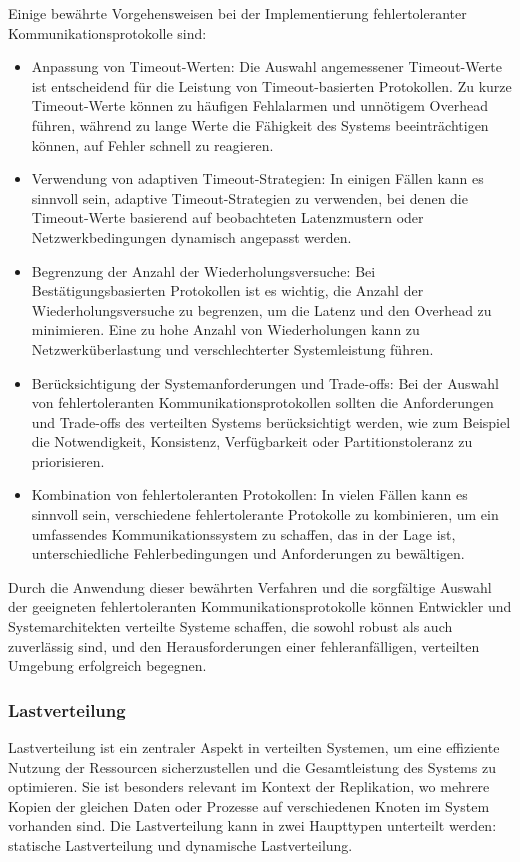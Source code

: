 Einige bewährte Vorgehensweisen bei der Implementierung fehlertoleranter Kommunikationsprotokolle sind:
\begin{itemize}
\item Anpassung von Timeout-Werten: Die Auswahl angemessener Timeout-Werte ist entscheidend für die Leistung von Timeout-basierten Protokollen. Zu kurze Timeout-Werte können zu häufigen Fehlalarmen und unnötigem Overhead führen, während zu lange Werte die Fähigkeit des Systems beeinträchtigen können, auf Fehler schnell zu reagieren.
\item Verwendung von adaptiven Timeout-Strategien: In einigen Fällen kann es sinnvoll sein, adaptive Timeout-Strategien zu verwenden, bei denen die Timeout-Werte basierend auf beobachteten Latenzmustern oder Netzwerkbedingungen dynamisch angepasst werden.
\item Begrenzung der Anzahl der Wiederholungsversuche: Bei Bestätigungsbasierten Protokollen ist es wichtig, die Anzahl der Wiederholungsversuche zu begrenzen, um die Latenz und den Overhead zu minimieren. Eine zu hohe Anzahl von Wiederholungen kann zu Netzwerküberlastung und verschlechterter Systemleistung führen.
\item Berücksichtigung der Systemanforderungen und Trade-offs: Bei der Auswahl von fehlertoleranten Kommunikationsprotokollen sollten die Anforderungen und Trade-offs des verteilten Systems berücksichtigt werden, wie zum Beispiel die Notwendigkeit, Konsistenz, Verfügbarkeit oder Partitionstoleranz zu priorisieren.
\item Kombination von fehlertoleranten Protokollen: In vielen Fällen kann es sinnvoll sein, verschiedene fehlertolerante Protokolle zu kombinieren, um ein umfassendes Kommunikationssystem zu schaffen, das in der Lage ist, unterschiedliche Fehlerbedingungen und Anforderungen zu bewältigen.
\end{itemize}
Durch die Anwendung dieser bewährten Verfahren und die sorgfältige Auswahl der geeigneten fehlertoleranten Kommunikationsprotokolle können Entwickler und Systemarchitekten verteilte Systeme schaffen, die sowohl robust als auch zuverlässig sind, und den Herausforderungen einer fehleranfälligen, verteilten Umgebung erfolgreich begegnen.


\subsubsection{Lastverteilung}
Lastverteilung ist ein zentraler Aspekt in verteilten Systemen, um eine effiziente Nutzung der Ressourcen sicherzustellen und die Gesamtleistung des Systems zu optimieren. Sie ist besonders relevant im Kontext der Replikation, wo mehrere Kopien der gleichen Daten oder Prozesse auf verschiedenen Knoten im System vorhanden sind. Die Lastverteilung kann in zwei Haupttypen unterteilt werden: statische Lastverteilung und dynamische Lastverteilung.

